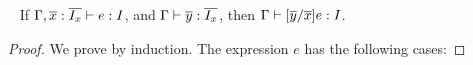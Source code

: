 \begin{lemma}~\label{lemma:subst_type_preservation}
If $\Gamma, \overline{x}:\overline{I_x} \; {\vdash} \;  e : I$, and
$\Gamma \; {\vdash} \; \overline{y}:\overline{I_x}$, then
$\Gamma \; {\vdash} \; [\overline{y}/\overline{x}]e : I$.

\begin{proof}

\begin{comment}
\noindent \textbf{Case Var.}
$ e = x \quad I = \Gamma(x) $. \\
If $x \notin \overline{x}$, then the conclusion is immediate, since $[\overline{y}/\overline{x}]x = x$.
On the other hand, if $x = x_i$ and $I = {I_x}_i$, then since $[\overline{y}/\overline{x}]x = [\overline{y}/\overline{x}]x_i = y_i$,
letting $I' = {I_y}_i$ finishes the case.

\noindent \textbf{Case New.}
$e = \new I$ and there are no term for substitution, the conclusion is obvious.
\noindent \textbf{Case Invk.}
$ e = e_0.m(\overline{e}) \quad
  \judgeewf {\Gamma, \overline{x}:\overline{I_x}} {e_0 : I_0} $
$$ mtype(m, I_0) = \overline{I_e} \rightarrow J $$
$$ \judgeewf {\Gamma, \overline{x}:\overline{I_x}} {\overline{e}:\overline{I}} \quad
    \overline{I} \subtype \overline{I_e} $$
By induction hypothesis, there are some $I_0'$ and $\overline{I_e'}$ such that
    $$ \judgeewf {\Gamma} {[\overline{y}/\overline{x}]e_0 : I_0'} \quad 
        I_0' \subtype I_0 $$
    $$ \judgeewf {\Gamma} {[\overline{y}/\overline{x}]\overline{e} : \overline{I_e'}} \quad  
        \overline{I_e'} \subtype \overline{I}$$    
By lemma~\ref{lemma2}, 
    $mtype(m, I_0') = \overline{I_e} \rightarrow J$.
    
\noindent Then $\overline{I_e'} \subtype \overline{I_e}$ by the transitivity of $\subtype$.
Therefore, by the rule \textsc{(T-Invk)}, 
    $\judgeewf {\Gamma} {[\overline{y}/\overline{x}]e_0.m([\overline{y}/\overline{x}]\overline{e}) : J}$.

\noindent \textbf{Case PathInvk.}
$ e = e_0.I::m(\overline{e}) $ and proof is similar as case Var.

\noindent \textbf{Case SuperInvk.}
$ e = \kwsuper.I::m(\overline{e}) $ \\
Suppose $\judgeewf {\Gamma} {\kwthis : I_0}$, the following proof should be similar as case Var.
\end{comment}
We prove by induction. The expression $e$ has the following cases:


\end{proof}
\end{lemma}
